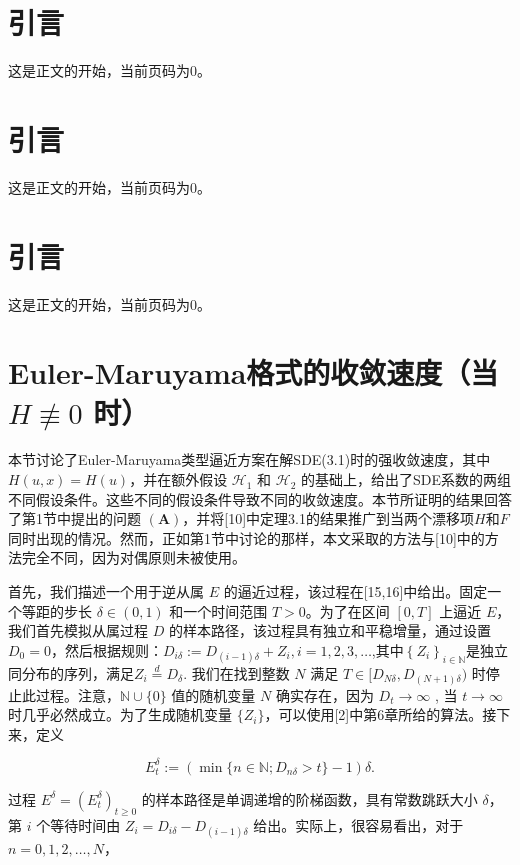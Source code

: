\documentclass[12pt,final]{article}
\numberwithin{equation}{section}
\numberwithin{figure}{section}
\numberwithin{table}{section}
\theoremstyle{plain}
\begin{document}
	
	
	\newpage
	\tableofcontents
	\section{引言}
	这是正文的开始，当前页码为0。
	\section{引言}
	这是正文的开始，当前页码为0。
	\section{引言}
	这是正文的开始，当前页码为0。
	\newpage
	\setcounter{page}{0} %
	
	\section{Euler-Maruyama格式的收敛速度（当 $H\not\equiv0$ 时）}
	本节讨论了Euler-Maruyama类型逼近方案在解SDE(3.1)时的强收敛速度，其中 $H(u,x)=H(u)$，并在额外假设 $\mathcal{H}_1$ 和 $\mathcal{H}_2$ 的基础上，给出了SDE系数的两组不同假设条件。这些不同的假设条件导致不同的收敛速度。本节所证明的结果回答了第1节中提出的问题 $(\mathbf{A})$，并将[10]中定理3.1的结果推广到当两个漂移项$H$和$F$同时出现的情况。然而，正如第1节中讨论的那样，本文采取的方法与[10]中的方法完全不同，因为对偶原则未被使用。
	
	首先，我们描述一个用于逆从属 $E$ 的逼近过程，该过程在[15,16]中给出。固定一个等距的步长 $\delta\in(0,1)$ 和一个时间范围 $T>0$。为了在区间 $[0,T]$ 上逼近 $E$，我们首先模拟从属过程 $D$ 的样本路径，该过程具有独立和平稳增量，通过设置 $D_0=0$，然后根据规则：$D_{i\delta} := D_{(i-1)\delta} + Z_i, i=1,2,3,\dots$,其中$\left\{Z_i\right\}_{i\in\mathbb{N}} $是独立同分布的序列，满足$Z_i \stackrel{d}{=} D_\delta.$
	我们在找到整数 $N$ 满足 $T \in [D_{N\delta}, D_{(N+1)\delta})$ 时停止此过程。注意，$\mathbb{N} \cup \{0\}$ 值的随机变量 $N$ 确实存在，因为 $D_t \to \infty$ , 当 $t \to \infty$ 时几乎必然成立。为了生成随机变量 $\{Z_i\}$，可以使用[2]中第6章所给的算法。接下来，定义
	
	\[
	E_t^\delta := \left(\min\{n \in \mathbb{N}; D_{n\delta} > t\} - 1\right) \delta.
	\]
	
	过程 $E^\delta = (E_t^\delta)_{t \geq 0}$ 的样本路径是单调递增的阶梯函数，具有常数跳跃大小 $\delta$，第 $i$ 个等待时间由 $Z_i = D_{i\delta} - D_{(i-1)\delta}$ 给出。实际上，很容易看出，对于 $n = 0, 1, 2, \dots, N$，
	
\end{document}
